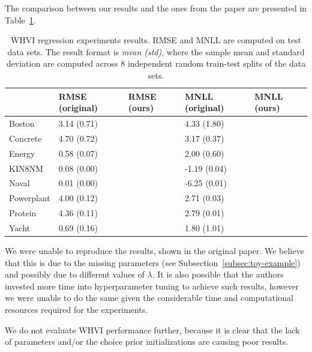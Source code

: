 The comparison between our results and the ones from the paper are presented in Table~\ref{tab:regression-experiments}.
\begin{table}[]
    \begin{tabular}{l|llll}
               & RMSE (original) & RMSE (ours) & { }MNLL (original) & MNLL (ours) \\ \hline
    Boston     & 3.14 (0.71)     &             & { }4.33 (1.80)     &             \\
    Concrete   & 4.70 (0.72)     &             & { }3.17 (0.37)     &             \\
    Energy     & 0.58 (0.07)     &             & { }2.00 (0.60)     &             \\
    KIN8NM     & 0.08 (0.00)     &             & -1.19 (0.04)       &             \\
    Naval      & 0.01 (0.00)     &             & -6.25 (0.01)       &             \\
    Powerplant & 4.00 (0.12)     &             & { }2.71 (0.03)     &             \\
    Protein    & 4.36 (0.11)     &             & { }2.79 (0.01)     &             \\
    Yacht      & 0.69 (0.16)     &             & { }1.80 (1.01)     &
    \end{tabular}
    \caption{WHVI regression experiments results. RMSE and MNLL are computed on test data sets. The result format is \textit{mean (std)}, where the sample mean and standard deviation are computed across 8 independent random train-test splits of the data sets.}
    \label{tab:regression-experiments}
\end{table}
We were unable to reproduce the results, shown in the original paper.
We believe that this is due to the missing parameters (see Subsection~\ref{subsec:toy-example}) and possibly due to different values of $\lambda$.
It is also possible that the authors invested more time into hyperparameter tuning to achieve such results, however we were unable to do the same given the considerable time and computational resources required for the experiments.

We do not evaluate WHVI performance further, because it is clear that the lack of parameters and/or the choice prior initializations are causing poor results.
